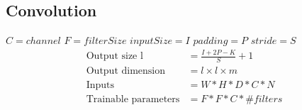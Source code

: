 \subsection*{Convolution}
    $C = channel$ $F = filterSize$ $inputSize = I$ $padding = P$
    $stride = S$ 
\begin{align*}
    \text{Output size l} &= \frac{I + 2P - K}{S} + 1\\
    \text{Output dimension} &= l \times l \times m \\
    \text{Inputs} &= W * H * D * C * N \\
    \text{Trainable parameters} &= F * F * C * \# filters
\end{align*}

